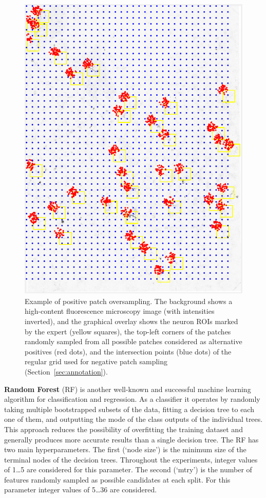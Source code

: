 \begin{figure}
	\centering
	\includegraphics[width=\columnwidth]{fig03}
	\caption{Example of positive patch oversampling. The background shows a high-content fluorescence microscopy image (with intensities inverted), and the graphical overlay shows the neuron ROIs marked by the expert (yellow squares), the top-left corners of the patches randomly sampled from all possible patches considered as alternative positives (red dots), and the intersection points (blue dots) of the regular grid used for negative patch sampling (Section~\ref{sec:annotation}).}
	\label{fig:oversampling}
\end{figure}

{\bf Random Forest} (RF) is another well-known and successful machine learning algorithm \cite{breiman2001random} for classification and regression. As a classifier it operates by randomly taking multiple bootstrapped subsets of the data, fitting a decision tree to each one of them, and outputting the mode of the class outputs of the individual trees. This approach reduces the possibility of overfitting the training dataset and generally produces more accurate results than a single decision tree. The RF has two main hyperparameters. The first (`node size') is the minimum size of the terminal nodes of the decision trees. Throughout the experiments, integer values of 1\dots5 are considered for this parameter. The second (`mtry') is the number of features randomly sampled as possible candidates at each split. For this parameter integer values of 5\dots36 are considered.

